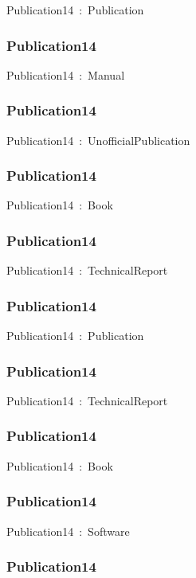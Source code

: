 \documentclass{article}
\begin{document}
Publication14~:~Publication

\subsubsection*{Publication14}

Publication14~:~Manual

\subsubsection*{Publication14}

Publication14~:~UnofficialPublication

\subsubsection*{Publication14}

Publication14~:~Book

\subsubsection*{Publication14}

Publication14~:~TechnicalReport

\subsubsection*{Publication14}

Publication14~:~Publication

\subsubsection*{Publication14}

Publication14~:~TechnicalReport

\subsubsection*{Publication14}

Publication14~:~Book

\subsubsection*{Publication14}

Publication14~:~Software

\subsubsection*{Publication14}
\end{document}
